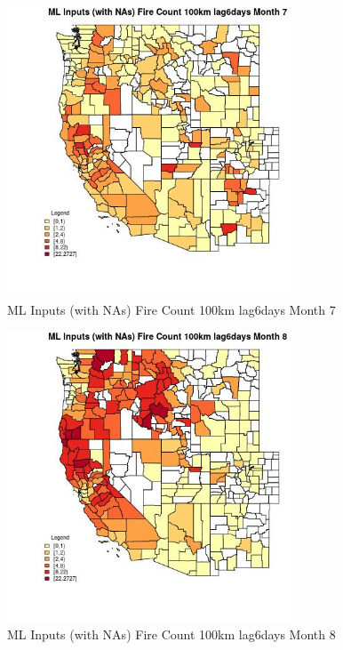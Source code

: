 \begin{figure} 
\centering  
\includegraphics[width=0.77\textwidth]{Code_Outputs/Report_ML_input_PM25_Step4_part_f_de_duplicated_aves_prioritize_24hr_obswNAs_CountyFire_Count_100km_lag6daysmedianMonth7.jpg} 
\caption{\label{fig:Report_ML_input_PM25_Step4_part_f_de_duplicated_aves_prioritize_24hr_obswNAsCountyFire_Count_100km_lag6daysmedianMonth7}ML Inputs (with NAs) Fire Count 100km lag6days Month 7} 
\end{figure} 
 

\begin{figure} 
\centering  
\includegraphics[width=0.77\textwidth]{Code_Outputs/Report_ML_input_PM25_Step4_part_f_de_duplicated_aves_prioritize_24hr_obswNAs_CountyFire_Count_100km_lag6daysmedianMonth8.jpg} 
\caption{\label{fig:Report_ML_input_PM25_Step4_part_f_de_duplicated_aves_prioritize_24hr_obswNAsCountyFire_Count_100km_lag6daysmedianMonth8}ML Inputs (with NAs) Fire Count 100km lag6days Month 8} 
\end{figure} 
 

